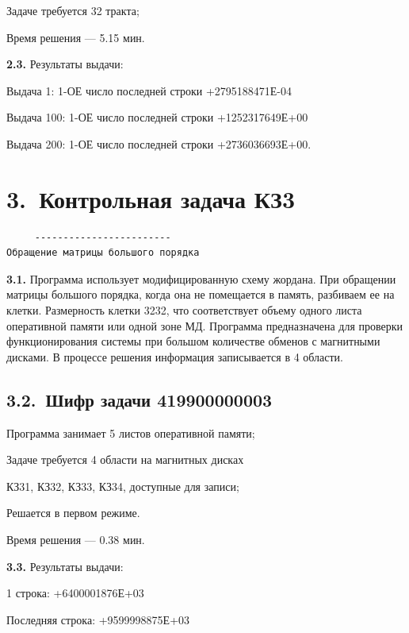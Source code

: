 \documentclass[11pt,a4paper]{article}
\begin{document}
Задаче требуется 32 тракта;

Время решения --- 5.15 мин.

\par\textbf{2.3.} Результаты выдачи:\par
Выдача 1: 1-ОЕ число последней строки +2795188471Е-04

Выдача 100: 1-ОЕ число последней строки +1252317649Е+00

Выдача 200: 1-ОЕ число последней строки +2736036693Е+00.

\section*{3.~Контрольная задача КЗ3}
\begin{center}\small
\begin{BVerbatim}
     ------------------------
Обращение матрицы большого порядка
\end{BVerbatim}
\end{center}

\par\textbf{3.1.} Программа использует модифицированную схему жордана. При обращении матрицы большого порядка, когда она не помещается в память, разбиваем ее на клетки. Размерность клетки 3232, что соответствует объему одного листа оперативной памяти или одной зоне МД. Программа предназначена для проверки функционирования системы при большом количестве обменов с магнитными дисками. В процессе решения информация записывается в 4 области.\par
\subsection*{3.2.~Шифр задачи 419900000003}
Программа занимает 5 листов оперативной памяти;

Задаче требуется 4 области на магнитных дисках

КЗ31, КЗ32, КЗ33, КЗ34, доступные для записи;

Решается в первом режиме.

Время решения --- 0.38 мин.

\par\textbf{3.3.} Результаты выдачи:\par
\begin{center}1 строка: +6400001876Е+03\end{center}
Последняя строка: +9599998875Е+03
\end{document}
